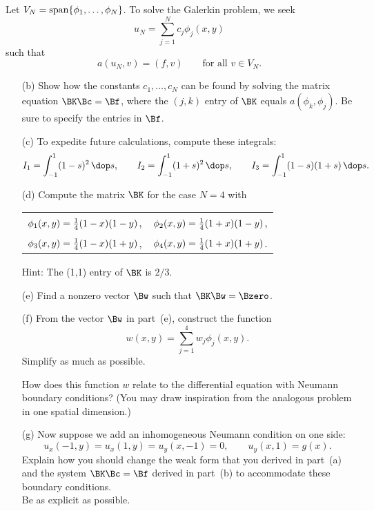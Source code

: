 \vspace*{1em}
Let $V_N = {\rm span}\{\phi_1, \ldots, \phi_N\}$.  
      To solve the Galerkin problem, we seek 
     \[ u_N = \sum_{j=1}^N c_j \phi_j(x,y)\]
      such that
      \[  a(u_N,v) = (f,v) \qquad \mbox{for all $v \in V_N$}.\]
\begin{enumerate} 
\item[(b)] Show how the constants $c_1, \ldots, c_N$ can be found
       by solving the matrix equation $\BK\Bc = \Bf$,
       where the $(j,k)$ entry of $\BK$ equals $a(\phi_k,\phi_j)$.
       Be sure to specify the entries in $\Bf$.

\vspace*{1em}
\item[(c)] To expedite future calculations, compute these integrals:
\[ I_1 = \int_{-1}^1 (1-s)^2\,\dop s, \qquad
   I_2 = \int_{-1}^1 (1+s)^2\,\dop s, \qquad
   I_3 = \int_{-1}^1 (1-s)(1+s)\,\dop s.\]

\newpage
\item[(d)] Compute the matrix $\BK$ for the case $N=4$ with
\begin{center}
\begin{tabular}{ll}
$\phi_1(x,y) = {1\over4}(1-x)(1-y)$, & 
$\phi_2(x,y) = {1\over4}(1+x)(1-y)$, \\[.5em]
$\phi_3(x,y) = {1\over4}(1-x)(1+y)$, & 
$\phi_4(x,y) = {1\over4}(1+x)(1+y)$.
\end{tabular}\end{center} 
Hint:  The (1,1) entry of $\BK$ is $2/3$.

\vspace*{1em}
\item[(e)] Find a nonzero vector $\Bw$ such that $\BK\Bw = \Bzero$.

\vspace*{1em}
\item[(f)] From the vector $\Bw$ in part~(e), construct the function
\[ w(x,y) = \sum_{j=1}^4 w_j \phi_j(x,y).\]
Simplify as much as possible.

How does this function $w$ relate to the differential equation
with Neumann boundary conditions?  (You may draw inspiration 
from the analogous problem in one spatial dimension.)

\vspace*{1em}
\item[(g)] Now suppose we add an inhomogeneous Neumann 
condition on one side:
\[ u_x(-1,y) = u_x(1,y) = u_y(x,-1)=0, \qquad u_y(x,1) = g(x).\]
Explain how you should change the weak form that you derived 
in part~(a) and the system $\BK\Bc=\Bf$ derived in part~(b)
to accommodate these boundary conditions.\\
Be as explicit as possible.

\end{enumerate}


